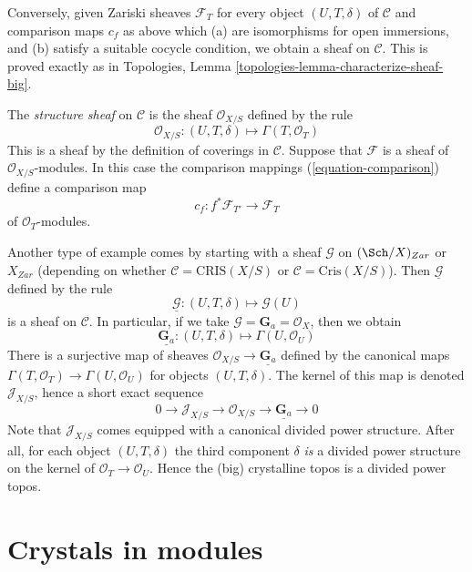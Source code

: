 \medskip\noindent
Conversely, given Zariski sheaves $\mathcal{F}_T$ for every object
$(U, T, \delta)$ of $\mathcal{C}$ and comparison maps
$c_f$ as above which (a) are isomorphisms for open immersions, and (b)
satisfy a suitable cocycle condition, we obtain a sheaf on
$\mathcal{C}$. This is proved exactly as in
Topologies, Lemma \ref{topologies-lemma-characterize-sheaf-big}.

\medskip\noindent
The {\it structure sheaf} on $\mathcal{C}$ is the sheaf
$\mathcal{O}_{X/S}$ defined by the rule
$$
\mathcal{O}_{X/S} :
(U, T, \delta)
\longmapsto
\Gamma(T, \mathcal{O}_T)
$$
This is a sheaf by the definition of coverings in $\mathcal{C}$.
Suppose that $\mathcal{F}$ is a sheaf of $\mathcal{O}_{X/S}$-modules.
In this case the comparison mappings (\ref{equation-comparison})
define a comparison map
\begin{equation}
\label{equation-comparison-modules}
c_f : f^*\mathcal{F}_{T'} \longrightarrow \mathcal{F}_T
\end{equation}
of $\mathcal{O}_T$-modules.

\medskip\noindent
Another type of example comes by starting with a sheaf
$\mathcal{G}$ on $(\Sch/X)_{Zar}$ or $X_{Zar}$ (depending on whether
$\mathcal{C} = \text{CRIS}(X/S)$ or $\mathcal{C} = \text{Cris}(X/S)$).
Then $\underline{\mathcal{G}}$ defined by the rule
$$
\underline{\mathcal{G}} :
(U, T, \delta)
\longmapsto
\mathcal{G}(U)
$$
is a sheaf on $\mathcal{C}$. In particular, if we take
$\mathcal{G} = \mathbf{G}_a = \mathcal{O}_X$, then we obtain
$$
\underline{\mathbf{G}_a} :
(U, T, \delta)
\longmapsto
\Gamma(U, \mathcal{O}_U)
$$
There is a surjective map of sheaves
$\mathcal{O}_{X/S} \to \underline{\mathbf{G}_a}$ defined by the
canonical maps $\Gamma(T, \mathcal{O}_T) \to \Gamma(U, \mathcal{O}_U)$
for objects $(U, T, \delta)$. The kernel of this map is denoted
$\mathcal{J}_{X/S}$, hence a short exact sequence
$$
0 \to
\mathcal{J}_{X/S} \to
\mathcal{O}_{X/S} \to
\underline{\mathbf{G}_a} \to 0
$$
Note that $\mathcal{J}_{X/S}$ comes equipped with a canonical
divided power structure. After all, for each object $(U, T, \delta)$
the third component $\delta$ {\it is} a divided power structure on the
kernel of $\mathcal{O}_T \to \mathcal{O}_U$. Hence the (big)
crystalline topos is a divided power topos.





\section{Crystals in modules}
\label{section-crystals}

